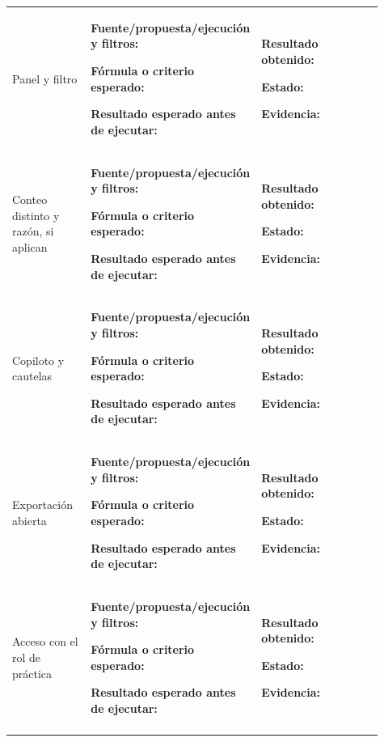 \begin{longtable}{@{}>{\RaggedRight\arraybackslash}p{0.22\linewidth}>{\RaggedRight\arraybackslash}p{0.3\linewidth}>{\RaggedRight\arraybackslash}p{0.39\linewidth}@{}}
\addlinespace[3pt]
Panel y filtro & \textbf{Fuente/propuesta/ejecución y filtros:} \par\smallskip\textbf{Fórmula o criterio esperado:} \par\smallskip\textbf{Resultado esperado antes de ejecutar:}  & \textbf{Resultado obtenido:} \par\smallskip\textbf{Estado:} \par\smallskip\textbf{Evidencia:}  \\
\addlinespace[3pt]
Conteo distinto y razón, si aplican & \textbf{Fuente/propuesta/ejecución y filtros:} \par\smallskip\textbf{Fórmula o criterio esperado:} \par\smallskip\textbf{Resultado esperado antes de ejecutar:}  & \textbf{Resultado obtenido:} \par\smallskip\textbf{Estado:} \par\smallskip\textbf{Evidencia:}  \\
\addlinespace[3pt]
Copiloto y cautelas & \textbf{Fuente/propuesta/ejecución y filtros:} \par\smallskip\textbf{Fórmula o criterio esperado:} \par\smallskip\textbf{Resultado esperado antes de ejecutar:}  & \textbf{Resultado obtenido:} \par\smallskip\textbf{Estado:} \par\smallskip\textbf{Evidencia:}  \\
\addlinespace[3pt]
Exportación abierta & \textbf{Fuente/propuesta/ejecución y filtros:} \par\smallskip\textbf{Fórmula o criterio esperado:} \par\smallskip\textbf{Resultado esperado antes de ejecutar:}  & \textbf{Resultado obtenido:} \par\smallskip\textbf{Estado:} \par\smallskip\textbf{Evidencia:}  \\
\addlinespace[3pt]
Acceso con el rol de práctica & \textbf{Fuente/propuesta/ejecución y filtros:} \par\smallskip\textbf{Fórmula o criterio esperado:} \par\smallskip\textbf{Resultado esperado antes de ejecutar:}  & \textbf{Resultado obtenido:} \par\smallskip\textbf{Estado:} \par\smallskip\textbf{Evidencia:}  \\
\addlinespace[3pt]
\end{longtable}
\endgroup

